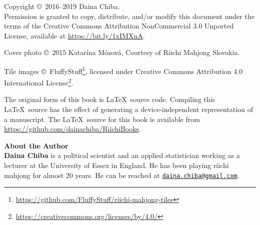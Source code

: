 \documentclass{book}
\begin{document}
\pagebreak

\pagebreak
\thispagestyle{empty}

\noindent
{\small
Copyright \copyright ~2016--2019 Daina Chiba.\\
Permission is granted to copy, distribute, and/or modify this document
under the terms of the Creative Commons Attribution NonCommercial 3.0 Unported License, available at \url{https://bit.ly/1xIMXnA}.

\vspace{.2in}
\noindent
Cover photo \copyright ~2015 Katar\'{i}na M\'{o}zov\'{a}, Courtesy of Riichi Mahjong Slovakia.

\vspace{.2in}
\noindent
Tile images \copyright ~FluffyStuff\footnote{\url{https://github.com/FluffyStuff/riichi-mahjong-tiles}}, licensed under Creative Commons Attribution 4.0 International License\footnote{\url{https://creativecommons.org/licenses/by/4.0/}}.

\vspace{.2in}
\noindent
The original form of this book is \LaTeX\ source code.  Compiling this
\LaTeX\ source has the effect of generating a device-independent
representation of a manuscript. The \LaTeX\ source for this book is available from 
\url{https://github.com/dainachiba/RiichiBooks}.

\vfill
\noindent
{\large\bf About the Author}\\

\noindent
{\bf Daina Chiba} is a political scientist and an applied statistician working as a lecturer at the University of Essex in England. 
He has been playing riichi mahjong for almost 20 years. 
He can be reached at \href{mailto:daina.chiba@gmail.com}{\tt daina.chiba@gmail.com}.
} %


\pagebreak

\let\cleardoublepage\clearpage




{
	\tableofcontents
}

\newpage

\mainmatter

\end{document}
